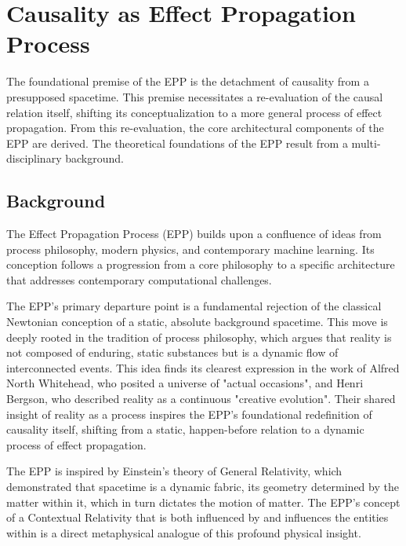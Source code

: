 \section{Causality as Effect Propagation Process}
\label{sec:epp}

The foundational premise of the EPP is the detachment of causality from a presupposed spacetime. This premise necessitates a re-evaluation of the causal relation itself, shifting its conceptualization to a more general process of effect propagation. From this re-evaluation, the core architectural components of the EPP are derived. The theoretical foundations of the EPP result from a multi-disciplinary background. 

%
%
\subsection{Background}
\label{sec:epp_background}

The Effect Propagation Process (EPP) builds upon a confluence of ideas from process philosophy, modern physics, and contemporary machine learning. Its conception follows a progression from a core philosophy to a specific architecture that addresses contemporary computational challenges.

The EPP's primary departure point is a fundamental rejection of the classical Newtonian conception of a static, absolute background spacetime. This move is deeply rooted in the tradition of process philosophy, which argues that reality is not composed of enduring, static substances but is a dynamic flow of interconnected events. This idea finds its clearest expression in the work of Alfred North Whitehead, who posited a universe of "actual occasions"\cite{whitehead2010process}, and Henri Bergson, who described reality as a continuous "creative evolution"\cite{bergson2022creative}. Their shared insight of reality as a process inspires the EPP's foundational redefinition of causality itself, shifting from a static, happen-before relation to a dynamic process of effect propagation.

The EPP is inspired by Einstein's theory of General Relativity\cite{EinsteinPapers1915}, which demonstrated that spacetime is a dynamic fabric, its geometry determined by the matter within it, which in turn dictates the motion of matter. The EPP's concept of a Contextual Relativity that is both influenced by and influences the entities within is a direct metaphysical analogue of this profound physical insight. 

